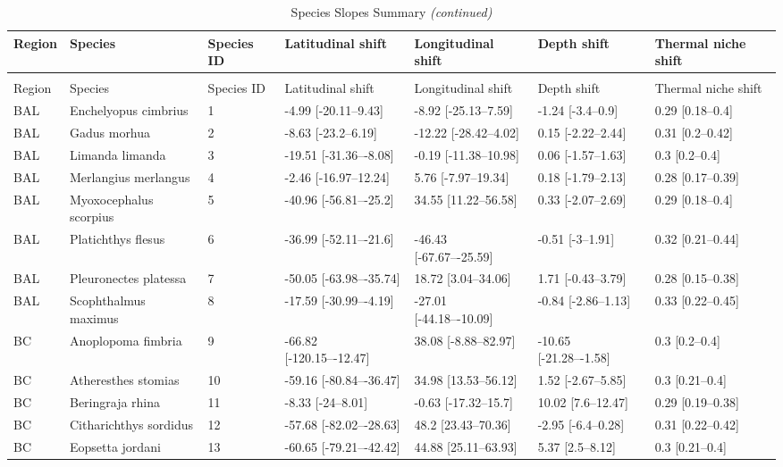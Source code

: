
\begin{longtable}[t]{lllllll}
\caption{Species Slopes Summary}\\
\toprule
Region & Species & Species ID & Latitudinal shift & Longitudinal shift & Depth shift & Thermal niche shift\\
\midrule
\endfirsthead
\caption[]{Species Slopes Summary \textit{(continued)}}\\
\toprule
Region & Species & Species ID & Latitudinal shift & Longitudinal shift & Depth shift & Thermal niche shift\\
\midrule
\endhead

\endfoot
\bottomrule
\endlastfoot
BAL & Enchelyopus cimbrius & 1 & -4.99 [-20.11–9.43] & -8.92 [-25.13–7.59] & -1.24 [-3.4–0.9] & 0.29 [0.18–0.4]\\
BAL & Gadus morhua & 2 & -8.63 [-23.2–6.19] & -12.22 [-28.42–4.02] & 0.15 [-2.22–2.44] & 0.31 [0.2–0.42]\\
BAL & Limanda limanda & 3 & -19.51 [-31.36–-8.08] & -0.19 [-11.38–10.98] & 0.06 [-1.57–1.63] & 0.3 [0.2–0.4]\\
BAL & Merlangius merlangus & 4 & -2.46 [-16.97–12.24] & 5.76 [-7.97–19.34] & 0.18 [-1.79–2.13] & 0.28 [0.17–0.39]\\
BAL & Myoxocephalus scorpius & 5 & -40.96 [-56.81–-25.2] & 34.55 [11.22–56.58] & 0.33 [-2.07–2.69] & 0.29 [0.18–0.4]\\
\addlinespace
BAL & Platichthys flesus & 6 & -36.99 [-52.11–-21.6] & -46.43 [-67.67–-25.59] & -0.51 [-3–1.91] & 0.32 [0.21–0.44]\\
BAL & Pleuronectes platessa & 7 & -50.05 [-63.98–-35.74] & 18.72 [3.04–34.06] & 1.71 [-0.43–3.79] & 0.28 [0.15–0.38]\\
BAL & Scophthalmus maximus & 8 & -17.59 [-30.99–-4.19] & -27.01 [-44.18–-10.09] & -0.84 [-2.86–1.13] & 0.33 [0.22–0.45]\\
BC & Anoplopoma fimbria & 9 & -66.82 [-120.15–-12.47] & 38.08 [-8.88–82.97] & -10.65 [-21.28–-1.58] & 0.3 [0.2–0.4]\\
BC & Atheresthes stomias & 10 & -59.16 [-80.84–-36.47] & 34.98 [13.53–56.12] & 1.52 [-2.67–5.85] & 0.3 [0.21–0.4]\\
\addlinespace
BC & Beringraja rhina & 11 & -8.33 [-24–8.01] & -0.63 [-17.32–15.7] & 10.02 [7.6–12.47] & 0.29 [0.19–0.38]\\
BC & Citharichthys sordidus & 12 & -57.68 [-82.02–-28.63] & 48.2 [23.43–70.36] & -2.95 [-6.4–0.28] & 0.31 [0.22–0.42]\\
BC & Eopsetta jordani & 13 & -60.65 [-79.21–-42.42] & 44.88 [25.11–63.93] & 5.37 [2.5–8.12] & 0.3 [0.21–0.4]\\

\end{longtable}
